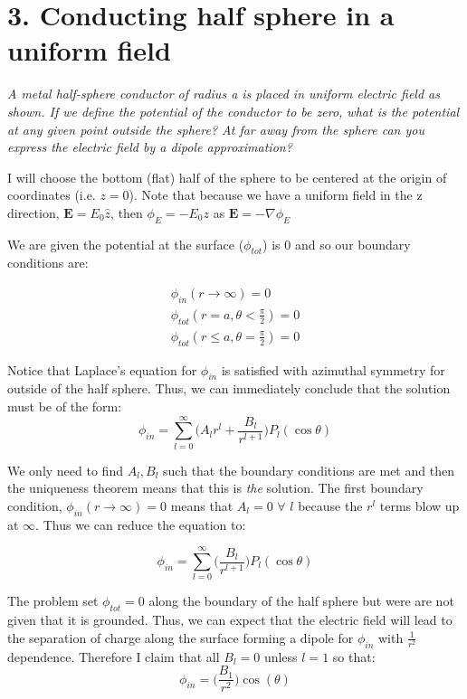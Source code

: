 \documentclass[a4paper, 11pt]{article}
\begin{document}
\section*{3. Conducting half sphere in a uniform field}
\textit{A metal half-sphere conductor of radius a is placed in uniform electric field as shown. If we define the potential of the conductor to be zero, what is the potential at any given point outside the sphere? At far away from the sphere can you express the electric field by a dipole approximation?}

I will choose the bottom (flat) half of the sphere to be centered at the origin of coordinates (i.e. $z = 0$). Note that because we have a uniform field in the z direction, $\mathbf{E} = E_0 \hat{z}$, then $\phi_E = -E_0z$ as $\mathbf{E} = -\nabla \phi_E$

We are given the potential at the surface ($\phi_{tot}$) is 0 and so our boundary conditions are: 

\begin{align}
	\phi_{in}(r \rightarrow \infty) = 0 \\ 
	\phi_{tot}(r=a, \theta < \frac{\pi}{2}) = 0 \\ 
	\phi_{tot}(r\leq a , \theta = \frac{\pi}{2}) = 0 
\end{align}

Notice that Laplace's equation for $\phi_{in}$ is satisfied with azimuthal symmetry for outside of the half sphere. Thus, we can immediately conclude that the solution must be of the form: 
\begin{equation*}
	\phi_{in} = \sum\limits_{l = 0}^{\infty} \bigg( A_lr^l + \frac{B_l}{r^{l+1}} \bigg)P_l (\cos{\theta})
\end{equation*}

We only need to find $A_l, B_l$ such that the boundary conditions are met and then the uniqueness theorem means that this is \textit{the} solution. The first boundary condition, $\phi_{in}(r\rightarrow \infty) = 0$ means that $A_l = 0$  $\forall$ $l$ because the $r^l$ terms blow up at $\infty$. Thus we can reduce the equation to: 

\begin{equation*}
	\phi_{in} = \sum\limits_{l = 0}^{\infty} \bigg( \frac{B_l}{r^{l+1}} \bigg)P_l(\cos{\theta})
\end{equation*}

The problem set $\phi_{tot} = 0$ along the boundary of the half sphere but were are not given that it is grounded. Thus, we can expect that the electric field will lead to the separation of charge along the surface forming a dipole for $\phi_{in}$ with $\frac{1}{r^2}$ dependence. Therefore I claim that all $B_l = 0$ unless $l = 1$ so that: 
\begin{equation*}
	\phi_{in} = \bigg( \frac{B_1}{r^2} \bigg)\cos(\theta)
\end{equation*}
\end{document}
